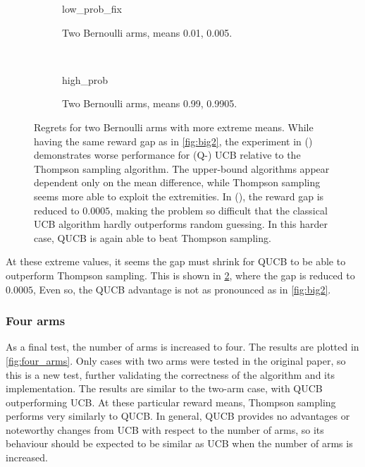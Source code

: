 \begin{figure}
    \centering
    \begin{subfigure}{\textwidth}
        \centering
        \newcommand{\myoptions}{
            width=10cm,
            height=8cm,
            xlabel={Kiloturn},
            ylabel={Regret},
            legend entries={UCB, QUCB, Thompson},
            legend pos=north west,
            legend cell align=left,
            mystyle,
        }
        {low_prob_fix}
        \caption{Two Bernoulli arms, means 0.01, 0.005.}
        \label{fig:low_prob_fix}
    \end{subfigure}
    \\[3ex]
    \begin{subfigure}{\textwidth}
        \centering
        \newcommand{\myoptions}{
            width=10cm,
            height=8cm,
            xlabel={Kiloturn},
            ylabel={Regret},
            legend entries={UCB, QUCB, Thompson},
            legend pos=north west,
            legend cell align=left,
            mystyle,
        }
        {high_prob}
        \caption{Two Bernoulli arms, means 0.99, 0.9905.}
        \label{fig:high_prob}
    \end{subfigure}
    \label{fig:low_high_prob}
    \caption[
        Regrets for two Bernoulli arms with more extreme means.
    ]{
        Regrets for two Bernoulli arms with more extreme means.
        While having the same reward gap as in \cref{fig:big2}, the experiment in (\protect{}) demonstrates worse performance for (Q-) UCB relative to the Thompson sampling algorithm.
        The upper-bound algorithms appear dependent only on the mean difference, while Thompson sampling seems more able to exploit the extremities.
        In (\protect{}), the reward gap is reduced to $0.0005$, making the problem so difficult that the classical UCB algorithm hardly outperforms random guessing.
        In this harder case, QUCB is again able to beat Thompson sampling.
    }
\end{figure}

At these extreme values, it seems the gap must shrink for QUCB to be able to outperform Thompson sampling.
This is shown in \cref{fig:high_prob}, where the gap is reduced to $0.0005$,
Even so, the QUCB advantage is not as pronounced as in \cref{fig:big2}.

\subsubsection{Four arms}
As a final test, the number of arms is increased to four.
The results are plotted in \cref{fig:four_arms}.
Only cases with two arms were tested in the original paper, so this is a new test, further validating the correctness of the algorithm and its implementation.
The results are similar to the two-arm case, with QUCB outperforming UCB.
At these particular reward means, Thompson sampling performs very similarly to QUCB.
In general, QUCB provides no advantages or noteworthy changes from UCB with respect to the number of arms, so its behaviour should be expected to be similar as UCB when the number of arms is increased.

